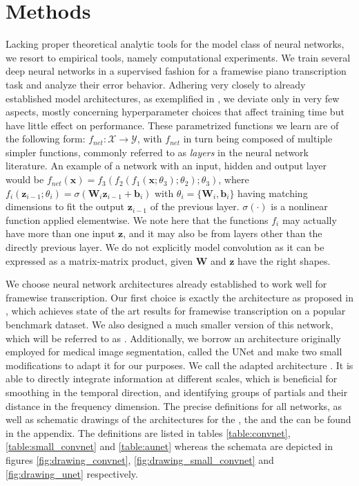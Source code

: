\section{Methods}
Lacking proper theoretical analytic tools for the model class of neural networks, we resort to empirical tools, namely computational experiments. We train several deep neural networks in a supervised fashion for a framewise piano transcription task and analyze their error behavior. Adhering very closely to already established model architectures, as exemplified in \cite{Sigtia_Benetos_Dixon_2016, Kelz_Dorfer_Korzeniowski_Boeck_Arzt_Widmer_2016}, we deviate only in very few aspects, mostly concerning hyperparameter choices that affect training time but have little effect on performance. These parametrized functions we learn are of the following form: $f_{net}: \mathcal{X} \rightarrow \mathcal{Y}$, with $f_{net}$ in turn being composed of multiple simpler functions, commonly referred to as \textit{layers} in the neural network literature. An example of a network with an input, hidden and output layer would be $f_{net}(\mathbf{x}) = f_3(f_2(f_1(\mathbf{x}; \theta_3); \theta_2); \theta_3)$, where $f_i(\mathbf{z}_{i-1};\theta_i) = \sigma(\mathbf{W}_i \mathbf{z}_{i-1} + \mathbf{b}_i)$ with $\theta_i = \{\mathbf{W}_i, \mathbf{b}_i\}$ having matching dimensions to fit the output $\mathbf{z}_{i-1}$ of the previous layer. $\sigma(\cdot)$ is a nonlinear function applied elementwise. We note here that the functions $f_i$ may actually have more than one input $\textbf{z}$, and it may also be from layers other than the directly previous layer. We do not explicitly model convolution as it can be expressed as a matrix-matrix product, given $\textbf{W}$ and $\textbf{z}$ have the right shapes.

We choose neural network architectures already established to work well for framewise transcription. Our first choice is exactly the \ConvNet architecture as proposed in \cite{Kelz_Dorfer_Korzeniowski_Boeck_Arzt_Widmer_2016}, which achieves state of the art results for framewise transcription on a popular benchmark dataset. We also designed a much smaller version of this network, which will be referred to as \SmallConvNetNPS. Additionally, we borrow an architecture originally employed for medical image segmentation, called the UNet \cite{Ronneberger_Fischer_Brox_2015} and make two small modifications to adapt it for our purposes. We call the adapted architecture \AUNetNPS. It is able to directly integrate information at different scales, which is beneficial for smoothing in the temporal direction, and identifying groups of partials and their distance in the frequency dimension. The precise definitions for all networks, as well as schematic drawings of the architectures for the \ConvNetNPS, the \SmallConvNet and the \AUNet can be found in the appendix. The definitions are listed in tables \ref{table:convnet}, \ref{table:small_convnet} and \ref{table:aunet} whereas the schemata are depicted in figures \ref{fig:drawing_convnet}, \ref{fig:drawing_small_convnet} and \ref{fig:drawing_unet} respectively.


